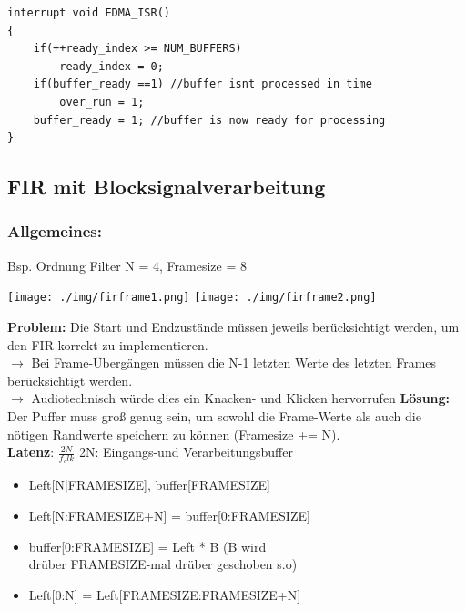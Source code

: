 \documentclass[10pt,a4paper]{article}
\begin{document}
\begin{verbatim}
interrupt void EDMA_ISR()
{
    if(++ready_index >= NUM_BUFFERS)
        ready_index = 0;
    if(buffer_ready ==1) //buffer isnt processed in time
        over_run = 1;
    buffer_ready = 1; //buffer is now ready for processing
}
\end{verbatim}

\subsection{FIR mit Blocksignalverarbeitung}
\subsubsection{Allgemeines:}
Bsp. Ordnung Filter N = 4, Framesize = 8\\
  \begin{center}
      \texttt{[image: ./img/firframe1.png]}
      \texttt{[image: ./img/firframe2.png]}
  \end{center}
\textbf{Problem:} Die Start und Endzustände müssen jeweils berücksichtigt werden, um den FIR korrekt zu implementieren.\\ 
$\rightarrow$ Bei Frame-Übergängen müssen die N-1 letzten Werte des letzten Frames berücksichtigt werden.\\
$\rightarrow$ Audiotechnisch würde dies ein \grqq{}Knacken-\grqq{} und \grqq{}Klicken\grqq{} hervorrufen
\textbf{Lösung:} Der Puffer muss groß genug sein, um sowohl die Frame-Werte als auch die nötigen Randwerte speichern zu können (Framesize += N).
\\
\textbf{Latenz}: $\frac{2N}{f_clk}$ 2N: Eingangs-und Verarbeitungsbuffer

\begin{itemize}
    \item Left[N|FRAMESIZE], buffer[FRAMESIZE]
    \item Left[N:FRAMESIZE+N] = buffer[0:FRAMESIZE]
    \item buffer[0:FRAMESIZE] = Left * B (B wird \\drüber FRAMESIZE-mal drüber geschoben s.o)
    \item Left[0:N] = Left[FRAMESIZE:FRAMESIZE+N]
\end{itemize}
\end{document}
